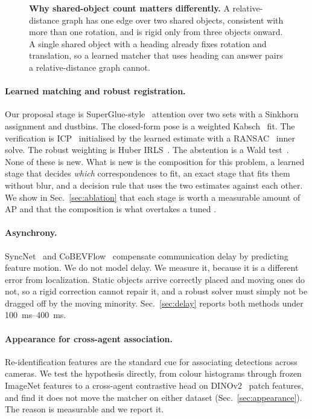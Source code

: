\begin{figure}[t]
  \centering
  \resizebox{\linewidth}{!}{}
  \caption{\textbf{Why shared-object count matters differently.} A relative-distance graph has one edge over two shared objects, consistent with more than one rotation, and is rigid only from three objects onward. A single shared object with a heading already fixes rotation and translation, so a learned matcher that uses heading can answer pairs a relative-distance graph cannot.}
  \label{fig:degenerate}
\end{figure}

\paragraph{Learned matching and robust registration.}
Our proposal stage is SuperGlue-style~\cite{sarlin2020superglue} attention over two sets with a Sinkhorn~\cite{cuturi2013sinkhorn} assignment and dustbins. The closed-form pose is a weighted Kabsch~\cite{kabsch1976solution} fit. The verification is ICP~\cite{besl1992icp} initialised by the learned estimate with a RANSAC~\cite{fischler1981ransac} inner solve. The robust weighting is Huber IRLS~\cite{huber1964robust}. The abstention is a Wald test~\cite{wald1943tests}. None of these is new. What is new is the composition for this problem, a learned stage that decides \emph{which} correspondences to fit, an exact stage that fits them without blur, and a decision rule that uses the two estimates against each other. We show in Sec.~\ref{sec:ablation} that each stage is worth a measurable amount of AP and that the composition is what overtakes a tuned \freealign.

\paragraph{Asynchrony.}
SyncNet~\cite{lei2022syncnet} and CoBEVFlow~\cite{wei2023cobevflow} compensate communication delay by predicting feature motion. We do not model delay. We measure it, because it is a different error from localization. Static objects arrive correctly placed and moving ones do not, so a rigid correction cannot repair it, and a robust solver must simply not be dragged off by the moving minority. Sec.~\ref{sec:delay} reports both methods under \SIrange{100}{400}{ms}.

\paragraph{Appearance for cross-agent association.}
Re-identification features are the standard cue for associating detections across cameras. We test the hypothesis directly, from colour histograms through frozen ImageNet features to a cross-agent contrastive head on DINOv2~\cite{oquab2023dinov2} patch features, and find it does not move the matcher on either dataset (Sec.~\ref{sec:appearance}). The reason is measurable and we report it.
